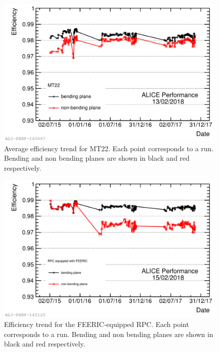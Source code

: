 \begin{figure}[!ht]
\begin{center}
\includegraphics[width=0.8\linewidth]{Chapters/Performance/Figs/2018-Feb-16-effTrend_2015-2017_Ch14.pdf}
\caption{Average efficiency trend for MT22. Each point corresponds to a run. Bending and non bending planes are shown in black and red respectively.}
\label{fig:MTR22efficiency}
\end{center}
\end{figure}

\begin{figure}[!hb]
\begin{center}
\includegraphics[width=0.8\linewidth]{Chapters/Performance/Figs/2018-Feb-16-effTrend_2015-2017_FEERIC.pdf}
\caption{Efficiency trend for the FEERIC-equipped RPC. Each point corresponds to a run. Bending and non bending planes are shown in black and red respectively.}
\label{fig:MTRFEERICefficiency}
\end{center}
\end{figure}

